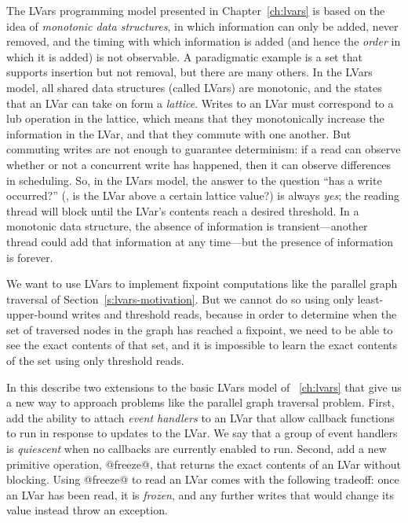 \ifdefined\DISSERTATION
The LVars programming model presented in Chapter~\ref{ch:lvars} is
based on the idea of \emph{monotonic data structures}, in which
information can only be added, never removed, and the timing with
which information is added (and hence the \emph{order} in which it is
added) is not observable.  A paradigmatic example is a set that
supports insertion but not removal, but there are many others.  In the
LVars model, all shared data structures (called LVars) are monotonic,
and the states that an LVar can take on form a \emph{lattice}.  Writes
to an LVar must correspond to a lub operation in the lattice, which
means that they monotonically increase the information in the LVar,
and that they commute with one another.  But commuting writes are not
enough to guarantee determinism: if a read can observe whether or not
a concurrent write has happened, then it can observe differences in
scheduling.  So, in the LVars model, the answer to the question ``has
a write occurred?''  (\ie, is the LVar above a certain lattice value?)
is always
\emph{yes}; the reading thread will block until the LVar's contents
reach a desired threshold.  In a monotonic data structure, the absence
of information is transient---another thread could add that
information at any time---but the presence of information is forever.
\fi

We want to use LVars to implement fixpoint computations like the
parallel graph traversal of Section~\ref{s:lvars-motivation}.  But we
cannot do so using only least-upper-bound writes and threshold reads,
because in order to determine when the set of traversed nodes in the
graph has reached a fixpoint, we need to be able to see the exact
contents of that set, and it is impossible to learn the exact contents
of the set using only threshold reads.

In this  describe two extensions to the basic LVars model
of ~\ref{ch:lvars} that give us a new way to approach problems like
the parallel graph traversal problem.
First,  add the ability to attach \emph{event handlers} to an LVar
that allow callback functions to run in response to updates to
the LVar.  We say that a group of event handlers is \emph{quiescent} when no callbacks
are currently enabled to run.  Second,  add a new primitive
operation, @freeze@, that returns the exact contents of an LVar
without blocking.  Using @freeze@ to read an LVar comes with the
following tradeoff: once an LVar has been read, it is \emph{frozen},
and any further writes that would change its value instead throw an
exception.

